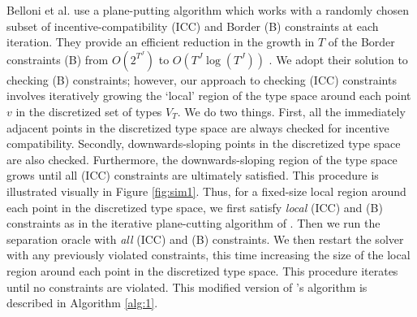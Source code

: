 \documentclass{article}
\newcounter{fig}
\begin{document}
Belloni et al. \autocite*{belloni2010multidimensional} use a plane-putting algorithm which works with a randomly chosen subset of incentive-compatibility (ICC) and Border (B) constraints at each iteration. They provide an efficient reduction in the growth in $T$ of the Border constraints (B) from $O(2^{T^J})$ to $O(T^J \log(T^J))$ \autocite[Lemma 10]{belloni2010multidimensional}. We adopt their solution to checking (B) constraints; however, our approach to checking (ICC) constraints involves iteratively growing the `local' region of the type space around each point $v$ in the discretized set of types $V_T$. We do two things. First, all the immediately adjacent points in the discretized type space are always checked for incentive compatibility. Secondly, downwards-sloping points in the discretized type space are also checked. Furthermore, the downwards-sloping region of the type space grows until all (ICC) constraints are ultimately satisfied. This procedure is illustrated visually in Figure \ref{fig:sim1}. Thus, for a fixed-size local region around each point in the discretized type space, we first satisfy \textit{local} (ICC) and (B) constraints as in the iterative plane-cutting algorithm of \autocite{belloni2010multidimensional}. Then we run the separation oracle with \textit{all} (ICC) and (B) constraints. We then restart the solver with any previously violated constraints, this time increasing the size of the local region around each point in the discretized type space. This procedure iterates until no constraints are violated. This modified version of \autocite{belloni2010multidimensional}'s algorithm is described in Algorithm \ref{alg:1}.
\end{document}
